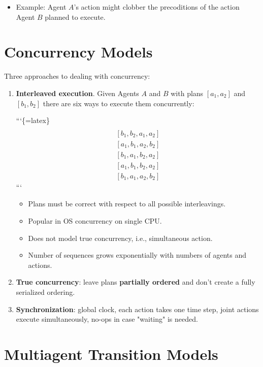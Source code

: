 \documentclass[11pt]{article}
\begin{document}
\begin{itemize}
\item Example: Agent \(A\)'s action might clobber the precoditions of the action Agent \(B\) planned to execute.
\end{itemize}
\section{Concurrency Models}
\label{sec:org9278575}

Three approaches to dealing with concurrency:

\begin{enumerate}
\item \textbf{Interleaved execution}.  Given Agents \(A\) and \(B\) with plans \([a_1, a_2]\) and \([b_1, b_2]\) there are six ways to execute them concurrently:

```\{=latex\}
\begin{align*}
[a_1,a_2,b_1,b_2]\\
[b_1,b_2,a_1,a_2]\\
[a_1,b_1,a_2,b_2]\\
[b_1,a_1,b_2,a_2]\\
[a_1,b_1,b_2,a_2]\\
[b_1,a_1,a_2,b_2]
\end{align*}
```

\begin{itemize}
\item Plans must be correct with respect to all possible interleavings.
\item Popular in OS concurrency on single CPU.
\item Does not model true concurrency, i.e., simultaneous action.
\item Number of sequences grows exponentially with numbers of agents and actions.
\end{itemize}

\item \textbf{True concurrency}: leave plans \textbf{partially ordered} and don't create a fully serialized ordering.

\item \textbf{Synchronization}: global clock, each action takes one time step, joint actions execute simultaneously, no-ops in case "waiting" is needed.
\end{enumerate}
\section{Multiagent Transition Models}
\label{sec:org5c021a7}
\end{document}
